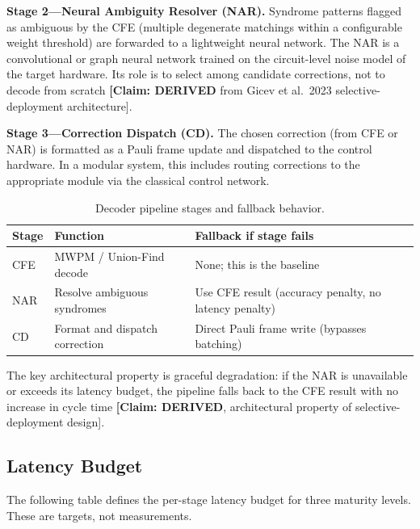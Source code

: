 \documentclass[conference]{IEEEtran}
\begin{document}
\textbf{Stage 2---Neural Ambiguity Resolver (NAR).} Syndrome patterns flagged as ambiguous by the CFE (multiple degenerate matchings within a configurable weight threshold) are forwarded to a lightweight neural network. The NAR is a convolutional or graph neural network trained on the circuit-level noise model of the target hardware. Its role is to select among candidate corrections, not to decode from scratch \textbf{[Claim: DERIVED} from Gicev et al.\ 2023 selective-deployment architecture].

\textbf{Stage 3---Correction Dispatch (CD).} The chosen correction (from CFE or NAR) is formatted as a Pauli frame update and dispatched to the control hardware. In a modular system, this includes routing corrections to the appropriate module via the classical control network.

\begin{table}[H]
\centering
\caption{Decoder pipeline stages and fallback behavior.}
\label{tab:pipeline-stages}
\footnotesize
\begin{tabularx}{\columnwidth}{lL{2.5cm}L{3.0cm}}
\toprule
\textbf{Stage} & \textbf{Function} & \textbf{Fallback if stage fails} \\
\midrule
CFE & MWPM / Union-Find decode & None; this is the baseline \\
NAR & Resolve ambiguous syndromes & Use CFE result (accuracy penalty, no latency penalty) \\
CD & Format and dispatch correction & Direct Pauli frame write (bypasses batching) \\
\bottomrule
\end{tabularx}
\end{table}

The key architectural property is graceful degradation: if the NAR is unavailable or exceeds its latency budget, the pipeline falls back to the CFE result with no increase in cycle time \textbf{[Claim: DERIVED}, architectural property of selective-deployment design].

\subsection{Latency Budget}

The following table defines the per-stage latency budget for three maturity levels. These are targets, not measurements.
\end{document}
